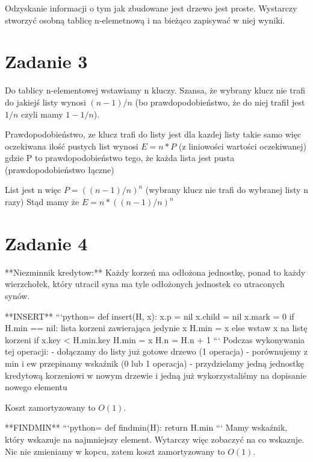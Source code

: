 \documentclass[12pt]{article}
\begin{document}
Odzyskanie informacji o tym jak zbudowane jest drzewo jest proste. Wystarczy stworzyć osobną tablicę n-elemetnową  i na bieżąco zapisywać w niej wyniki.

\section{Zadanie 3}

Do tablicy n-elementowej wstawiamy n kluczy.
Szansa, że wybrany klucz nie trafi do jakiejś listy wynosi $(n-1)/n$ (bo prawdopodobieństwo, że do niej trafił jest $1/n$ czyli mamy $1 - 1/n$).


Prawdopodobieństwo, ze klucz trafi do listy jest dla kazdej listy takie samo więc oczekiwana ilość pustych list wynosi $E = n * P$ (z liniowości wartości oczekiwanej) gdzie P to prawdopodobieństwo tego, że każda lista jest pusta (prawdopodobieństwo łączne)

List jest n więc 
$P=((n-1)/n)^n$ (wybrany klucz nie trafi do wybranej listy n razy)
Stąd mamy że  $E = n * ((n-1)/n)^n$

\section{Zadanie 4}

**Niezminnik kredytow:** Każdy korzeń ma odłożona jednostkę, ponad to każdy wierzchołek, który utracil syna ma tyle odłożonych jednostek co utraconych synów.

**INSERT**
```python=
def insert(H, x):
    x.p = nil
    x.child = nil
    x.mark = 0
    if H.min == nil:
        lista korzeni zawierająca jedynie x
        H.min = x
    else 
        wstaw x na listę korzeni
        if x.key < H.min.key
            H.min = x
    H.n = H.n + 1           
``` 
Podczas wykonywania tej operacji:
- dołączamy do listy już gotowe drzewo (1 operacja)
- porównujemy z min i ew przepinamy wskaźnik (0 lub 1 operacja)
- przydzielamy jedną jednostkę kredytową korzeniowi w nowym drzewie i jedną już wykorzystaliśmy na dopisanie nowego elementu

Koszt zamortyzowany to $O(1)$.

**FINDMIN**
```python=
def findmin(H):
     return H.min
```
Mamy wskaźnik, który wskazuje na najmniejszy element. Wytarczy więc zobaczyć na co wskazuje.
Nic nie zmieniamy w kopcu, zatem koszt zamortyzowany to $O(1)$.
\end{document}
